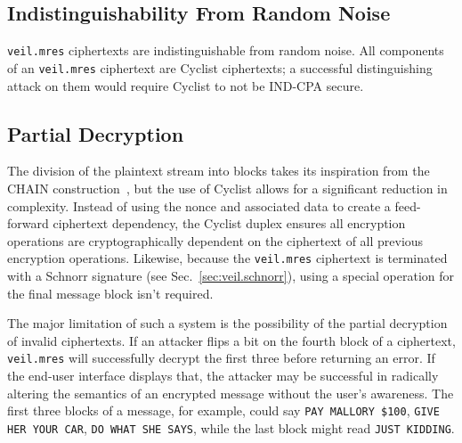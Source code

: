 \subsection{Indistinguishability From Random Noise}\label{subsec:veil.mres-indistinguishability}

\texttt{veil.mres} ciphertexts are indistinguishable from random noise.
All components of an \texttt{veil.mres} ciphertext are Cyclist ciphertexts;
a successful distinguishing attack on them would require Cyclist to not be IND-CPA secure.

\subsection{Partial Decryption}\label{subsec:veil.mres-partial-decryption}

The division of the plaintext stream into blocks takes its inspiration from the CHAIN
construction~\cite{hoang2015}\@, but the use of Cyclist allows for a significant reduction in
complexity.
Instead of using the nonce and associated data to create a feed-forward ciphertext dependency, the
Cyclist duplex ensures all encryption operations are cryptographically dependent on the ciphertext
of all previous encryption operations.
Likewise, because the \texttt{veil.mres} ciphertext is terminated with a Schnorr signature (see
Sec.~\ref{sec:veil.schnorr}), using a special operation for the final message block isn't required.

The major limitation of such a system is the possibility of the partial decryption of invalid
ciphertexts.
If an attacker flips a bit on the fourth block of a ciphertext, \texttt{veil.mres} will successfully
decrypt the first three before returning an error.
If the end-user interface displays that, the attacker may be successful in radically altering the
semantics of an encrypted message without the user's awareness.
The first three blocks of a message, for example, could say \texttt{PAY MALLORY \$100}, \texttt{GIVE
    HER YOUR CAR}, \texttt{DO WHAT SHE SAYS}, while the last block might read \texttt{JUST KIDDING}\@.
